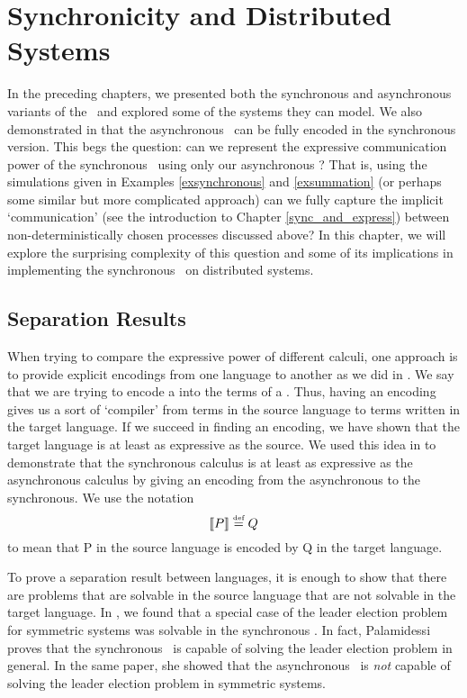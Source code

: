 \chapter{Synchronicity and Distributed Systems}\label{sync_and_dist_sys}
In the preceding chapters, we presented both the synchronous and asynchronous variants of the \picalc\ and explored some of the systems they can model.  
We also demonstrated in  that the asynchronous \picalc\ can be fully encoded in the synchronous version.
This begs the question: can we represent the expressive communication power of the synchronous \picalc\ using only our asynchronous \picalc?  That is, using the simulations given in Examples \ref{exsynchronous} and \ref{exsummation} (or perhaps some similar but more complicated approach) can we fully capture the implicit `communication' (see the introduction to Chapter \ref{sync_and_express}) between non-deterministically chosen processes discussed above?  In this chapter, we will explore the surprising complexity of this question and some of its implications in implementing the synchronous \picalc\ on distributed systems.  



\section{Separation Results}\label{Separation Results}
When trying to compare the expressive power of different calculi, one approach is to provide explicit encodings from one language to another as we did in .
We say that we are trying to encode a  into the terms of a . 
Thus, having an encoding gives us a sort of `compiler' from terms in the source language to terms written in the target language.
If we succeed in finding an encoding, we have shown that the target language is at least as expressive as the source.  
We used this idea in  to demonstrate that the synchronous calculus is at least as expressive as the asynchronous calculus by giving an encoding from the asynchronous to the synchronous.  
We use the notation
\[
	\llbracket{P}\rrbracket \overset{\mbox{\tiny{def}}}{=} Q
\]
to mean that P in the source language is encoded by Q in the target language.

To prove a separation result between languages, it is enough to show that there are problems that are solvable in the source language that are not solvable in the target language.
In , we found that a special case of the leader election problem for symmetric systems was solvable in the synchronous \picalc.
In fact, Palamidessi \cite{palam03} proves that the synchronous \picalc\ is capable of solving the leader election problem in general.
In the same paper, she showed that the asynchronous \picalc\ is \emph{not} capable of solving the leader election problem in symmetric systems.
 
